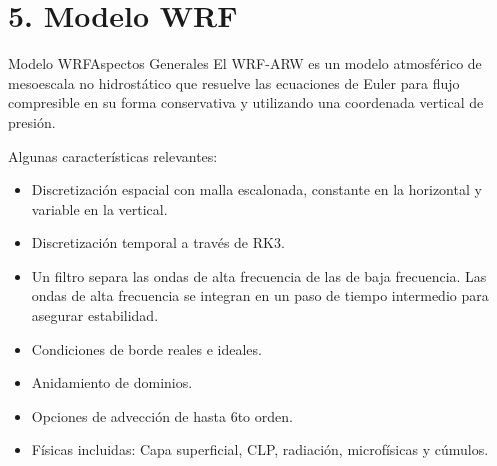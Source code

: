 \documentclass[mathserif,10pt]{beamer}
\begin{document}
\section{5. Modelo WRF}
\begin{frame}{Modelo WRF}{Aspectos Generales}
	El WRF-ARW es un modelo atmosférico de mesoescala no hidrostático que resuelve las ecuaciones de Euler para flujo compresible en su forma conservativa y utilizando una coordenada vertical de presión.
	
	Algunas características relevantes:
	\begin{itemize}
		\item Discretización espacial con malla escalonada, constante en la horizontal y variable en la vertical.
		\item Discretización temporal a través de RK3.
		\item Un filtro separa las ondas de alta frecuencia de las de baja frecuencia. Las ondas de alta frecuencia se integran en un paso de tiempo intermedio para asegurar estabilidad.
		\item Condiciones de borde reales e ideales.
		\item Anidamiento de dominios.
		\item Opciones de advección de hasta 6to orden.
		\item Físicas incluidas: Capa superficial, CLP, radiación, microfísicas y cúmulos.
	
	\end{itemize}
\end{frame}
\end{document}
